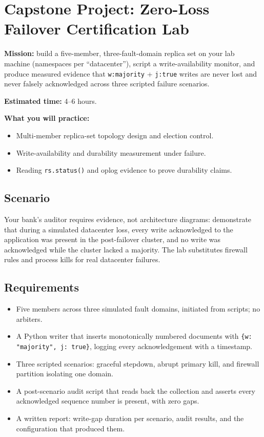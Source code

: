 \section{Capstone Project: Zero-Loss Failover Certification Lab}\label{sec:ch5-capstone}

\begin{capstonebox}
\textbf{Mission:} build a five-member, three-fault-domain replica set on your lab machine (namespaces per ``datacenter''), script a write-availability monitor, and produce measured evidence that \texttt{w:majority} + \texttt{j:true} writes are never lost and never falsely acknowledged across three scripted failure scenarios.

\textbf{Estimated time:} 4--6 hours.

\textbf{What you will practice:}
\begin{itemize}
    \item Multi-member replica-set topology design and election control.
    \item Write-availability and durability measurement under failure.
    \item Reading \texttt{rs.status()} and oplog evidence to prove durability claims.
\end{itemize}
\end{capstonebox}

\subsection*{Scenario}
Your bank's auditor requires evidence, not architecture diagrams: demonstrate that during a simulated datacenter loss, every write acknowledged to the application was present in the post-failover cluster, and no write was acknowledged while the cluster lacked a majority. The lab substitutes firewall rules and process kills for real datacenter failures.

\subsection*{Requirements}
\begin{itemize}
    \item Five members across three simulated fault domains, initiated from scripts; no arbiters.
    \item A Python writer that inserts monotonically numbered documents with \texttt{\{w: "majority", j: true\}}, logging every acknowledgement with a timestamp.
    \item Three scripted scenarios: graceful stepdown, abrupt primary kill, and firewall partition isolating one domain.
    \item A post-scenario audit script that reads back the collection and asserts every acknowledged sequence number is present, with zero gaps.
    \item A written report: write-gap duration per scenario, audit results, and the configuration that produced them.
\end{itemize}

